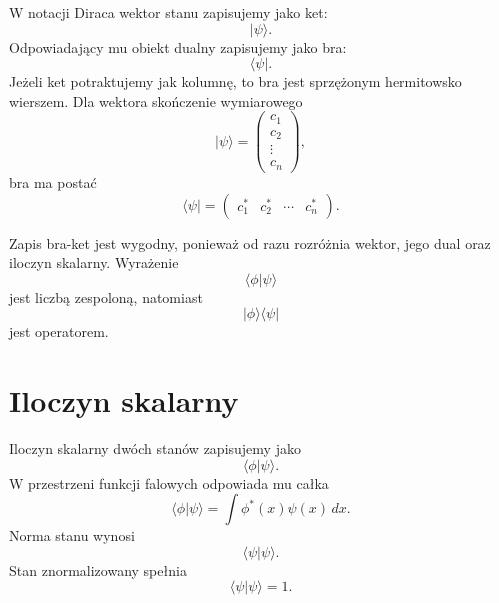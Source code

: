 W notacji Diraca wektor stanu zapisujemy jako ket:
\begin{equation}
    |\psi\rangle.
\end{equation}
Odpowiadający mu obiekt dualny zapisujemy jako bra:
\begin{equation}
    \langle\psi|.
\end{equation}
Jeżeli ket potraktujemy jak kolumnę, to bra jest sprzężonym hermitowsko wierszem. Dla wektora skończenie wymiarowego
\begin{equation}
    |\psi\rangle=\begin{pmatrix}c_1\\ c_2\\ \vdots\\ c_n\end{pmatrix},
\end{equation}
bra ma postać
\begin{equation}
    \langle\psi|=\begin{pmatrix}c_1^* & c_2^* & \cdots & c_n^*\end{pmatrix}.
\end{equation}

Zapis bra-ket jest wygodny, ponieważ od razu rozróżnia wektor, jego dual oraz iloczyn skalarny. Wyrażenie
\begin{equation}
    \langle\phi|\psi\rangle
\end{equation}
jest liczbą zespoloną, natomiast
\begin{equation}
    |\phi\rangle\langle\psi|
\end{equation}
jest operatorem.

\section{Iloczyn skalarny}

Iloczyn skalarny dwóch stanów zapisujemy jako
\begin{equation}
    \langle\phi|\psi\rangle.
\end{equation}
W przestrzeni funkcji falowych odpowiada mu całka
\begin{equation}
    \langle\phi|\psi\rangle=\int \phi^*(x)\psi(x)\,dx.
\end{equation}
Norma stanu wynosi
\begin{equation}
    \langle\psi|\psi\rangle.
\end{equation}
Stan znormalizowany spełnia
\begin{equation}
    \langle\psi|\psi\rangle=1.
\end{equation}

